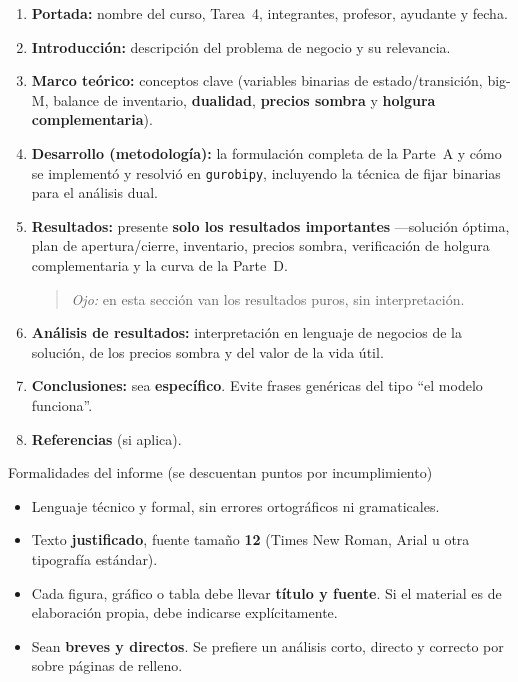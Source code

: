 \documentclass[12pt,a4paper]{article}
\begin{document}
\begin{enumerate}[leftmargin=*, topsep=2pt]
    \item \textbf{Portada:} nombre del curso, Tarea~4, integrantes, profesor,
          ayudante y fecha.
    \item \textbf{Introducción:} descripción del problema de negocio y su
          relevancia.
    \item \textbf{Marco teórico:} conceptos clave (variables binarias de
          estado/transición, big-M, balance de inventario, \textbf{dualidad},
          \textbf{precios sombra} y \textbf{holgura complementaria}).
    \item \textbf{Desarrollo (metodología):} la formulación completa de la
          Parte~A y cómo se implementó y resolvió en \texttt{gurobipy}, incluyendo
          la técnica de fijar binarias para el análisis dual.
    \item \textbf{Resultados:} presente \textbf{solo los resultados importantes}
          —solución óptima, plan de apertura/cierre, inventario, precios sombra,
          verificación de holgura complementaria y la curva de la Parte~D.
          \begin{quote}
          \textit{Ojo:} en esta sección van los resultados puros, sin
          interpretación.
          \end{quote}
    \item \textbf{Análisis de resultados:} interpretación en lenguaje de negocios
          de la solución, de los precios sombra y del valor de la vida útil.
    \item \textbf{Conclusiones:} sea \textbf{específico}. Evite frases genéricas
          del tipo ``el modelo funciona''.
    \item \textbf{Referencias} (si aplica).
\end{enumerate}

\begin{ayuda}{Formalidades del informe (se descuentan puntos por incumplimiento)}
\begin{itemize}[topsep=2pt]
    \item Lenguaje técnico y formal, sin errores ortográficos ni gramaticales.
    \item Texto \textbf{justificado}, fuente tamaño \textbf{12} (Times New Roman,
          Arial u otra tipografía estándar).
    \item Cada figura, gráfico o tabla debe llevar \textbf{título y fuente}. Si el
          material es de elaboración propia, debe indicarse explícitamente.
    \item Sean \textbf{breves y directos}. Se prefiere un análisis corto, directo
          y correcto por sobre páginas de relleno.
\end{itemize}
\end{ayuda}
\end{document}
